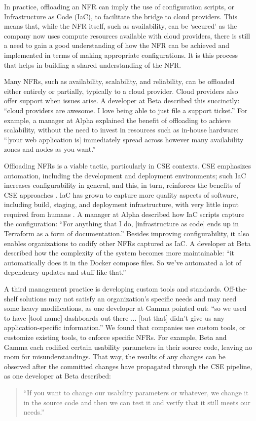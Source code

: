 \documentclass[smallextended]{svjour3}       %
\begin{document}
In practice, offloading an NFR can imply the use of configuration scripts, or Infrastructure as Code (IaC), to facilitate the bridge to cloud providers. This means that, while the NFR itself, such as availability, can be `secured' as the company now uses compute resources available with cloud providers, there is still a need to gain a good understanding of how the NFR can be achieved and implemented in terms of making appropriate configurations. It is this process that helps in building a shared understanding of the NFR. 


Many NFRs, such as availability, scalability, and reliability, can be offloaded either entirely or partially, typically to a cloud provider.  
Cloud providers also offer support when issues arise. A developer at Beta described this succinctly: \textmd{``cloud providers are awesome. I love being able to just file a support ticket.''}
For example, a manager at Alpha explained the benefit of offloading to achieve scalability, without the need to invest in resources such as in-house hardware:
\textmd{``[your web application is] immediately spread across however many availability zones and nodes as you want.''}



Offloading NFRs is a viable tactic, particularly in CSE contexts. CSE emphasizes automation, including the development and deployment environments; such IaC increases configurability in general, and this, in turn, reinforces the benefits of CSE approaches \citep{humble2010continuous}.
IaC has grown to capture more quality aspects of software, including build, staging, and deployment infrastructure, with very little input required from humans \citep{humble2018accelerate}.
A manager at Alpha described how IaC scripts capture the configuration:
\textmd{``For anything that I do, [infrastructure as code] ends up in Terraform as a form of documentation.''} 
Besides improving configurability, it also enables organizations to codify other NFRs captured as IaC. 
A developer at Beta described how the complexity of the system becomes more maintainable:
\textmd{``it automatically does it in the Docker compose files. So we've automated a lot of dependency updates and stuff like that.''}



A third management practice is developing custom tools and standards. 
Off-the-shelf solutions may not satisfy an organization's specific needs and may need some heavy modifications, as one developer at Gamma pointed out:
\textmd{``so we used to have [tool name] dashboards out there ... [but that] didn't give us any application-specific information.''}
We found that companies use custom tools, or customize existing tools, to enforce specific NFRs. 
For example, Beta and Gamma each codified certain usability parameters in their source code, leaving no room for misunderstandings. That way, the results of any changes can be observed after the committed changes have propagated through the CSE pipeline, as one developer at Beta described:
\begin{quote}
    ``If you want to change our usability parameters or whatever, we change it in the source code and then we can test it and verify that it still meets our needs.''
\end{quote}    
\end{document}
